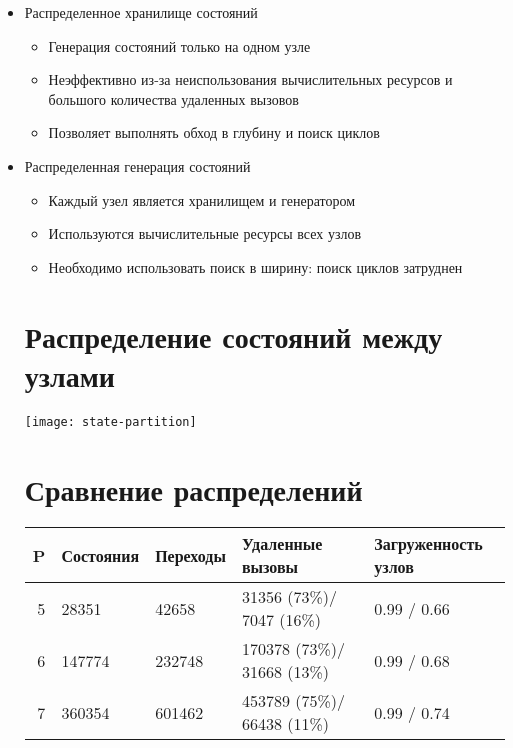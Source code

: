 \documentclass[12pt]{article}
\begin{document}
\begin{itemize}
\item Распределенное хранилище состояний
  \begin{itemize}
  \item Генерация состояний только на одном узле
  \item Неэффективно из-за неиспользования вычислительных ресурсов и большого количества
    удаленных вызовов
  \item Позволяет выполнять обход в глубину и поиск циклов
  \end{itemize}

\item Распределенная генерация состояний
  \begin{itemize}
  \item Каждый узел является хранилищем и генератором
  \item Используются вычислительные ресурсы всех узлов
  \item Необходимо использовать поиск в ширину: поиск циклов затруднен
  \end{itemize}

\section{Распределение состояний между узлами}
\label{sec:state-partitioning}

\texttt{[image: state-partition]}

\section{Сравнение распределений}
\label{sec:partition-compare}

\begin{tabular}[ht]{|r|l|l|p{}|p{}|}
  \hline 
  P & Состояния & Переходы & Удаленные вызовы & Загруженность узлов    \\ \hline
  5 & 28351     & 42658    & 31356  (73\%)/ 7047  (16\%) & 0.99 / 0.66 \\ \hline
  6 & 147774    & 232748   & 170378 (73\%)/ 31668 (13\%) & 0.99 / 0.68 \\ \hline
  7 & 360354    & 601462   & 453789 (75\%)/ 66438 (11\%) & 0.99 / 0.74 \\ \hline
\end{tabular}

\end{itemize}
\end{document}
